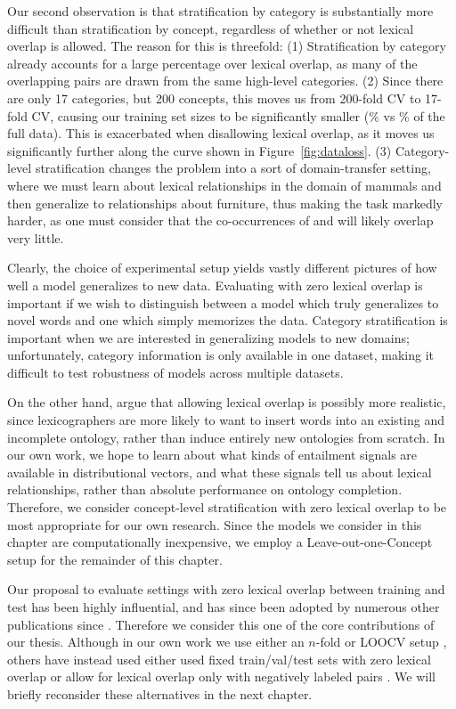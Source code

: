 Our second observation is that stratification by category is substantially
more difficult than stratification by concept, regardless of whether or
not lexical overlap is allowed. The reason for this is threefold:
(1) Stratification by category already accounts for a large percentage over
lexical overlap, as many of the overlapping pairs are drawn from the same
high-level categories. (2) Since there are only 17 categories, but 200 concepts,
this moves us from 200-fold CV to 17-fold CV, causing our training set sizes
to be significantly smaller (\% vs \% of the full
data). This is exacerbated when disallowing lexical overlap, as it moves us
significantly further along the curve shown in Figure~\ref{fig:dataloss}.
(3) Category-level stratification changes the problem into a sort of
domain-transfer setting, where we must learn about lexical relationships in
the domain of mammals and then generalize to relationships about
furniture, thus making the task markedly harder, as one must consider
that the co-occurrences of  and  will likely overlap
very little.

Clearly, the choice of experimental setup yields vastly different pictures of
how well a model generalizes to new data. Evaluating with zero lexical overlap
is important if we wish to distinguish between a model which truly generalizes
to novel words and one which simply memorizes the data. Category stratification
is important when we are interested in generalizing models to new domains;
unfortunately, category information is only available in one dataset, making
it difficult to test robustness of models across multiple datasets.

On the other hand,  argue that allowing lexical
overlap is possibly more realistic, since lexicographers are more likely to
want to insert words into an existing and incomplete ontology, rather than
induce entirely new ontologies from scratch. In our own work, we hope to learn
about what kinds of entailment signals are available in distributional
vectors, and what these signals tell us about lexical relationships, rather
than absolute performance on ontology completion. Therefore, we consider
concept-level stratification with zero lexical overlap to be most appropriate
for our own research. Since the models we consider in this chapter are
computationally inexpensive, we employ a Leave-out-one-Concept setup for the
remainder of this chapter.

Our proposal to evaluate settings with zero lexical overlap between training
and test has been highly influential, and has since been adopted by numerous
other publications since
\cite{levy:2015:naacl,kruszewski:2015:tacl,roller:2016:emnlp,shwartz:2016:acl,vylomova:2016:acl}.
Therefore we consider this one of the core contributions of our thesis.
Although in our own work we use either an $n$-fold \cite{roller:2016:emnlp} or
LOOCV setup \cite{roller:2014:coling}, others have instead used either used
fixed train/val/test sets with zero lexical overlap
\cite{levy:2015:naacl,shwartz:2016:acl,vylomova:2016:acl} or allow for lexical
overlap only with negatively labeled pairs \cite{kruszewski:2015:tacl}. We
will briefly reconsider these alternatives in the next chapter.

